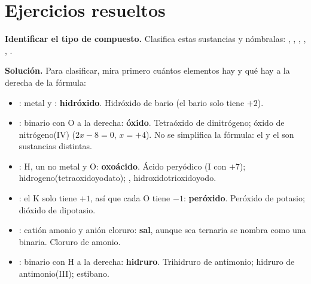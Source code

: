 
\sloppy %

\section{Ejercicios resueltos}\label{sec:ud5-resueltos}

\begin{example}
    \textbf{Identificar el tipo de compuesto.} Clasifica estas sustancias y nómbralas: , , ,
    , , .

    \textbf{Solución.} Para clasificar, mira primero cuántos elementos hay y qué hay a la derecha de la fórmula:
    \begin{itemize}
        \item {}: metal y : \textbf{hidróxido}. Hidróxido de bario (el bario solo tiene \(+2\)).
        \item {}: binario con O a la derecha: \textbf{óxido}. Tetraóxido de dinitrógeno; óxido de nitrógeno(IV)
        (\(2x - 8 = 0\), \(x = +4\)). No se simplifica la fórmula: el  y el  son sustancias distintas.
        \item {}: H, un no metal y O: \textbf{oxoácido}. Ácido peryódico (I con \(+7\)); hidrogeno(tetraoxidoyodato);
        , hidroxidotrioxidoyodo.
        \item {}: el K solo tiene \(+1\), así que cada O tiene \(-1\): \textbf{peróxido}. Peróxido de potasio; dióxido de
        dipotasio.
        \item {}: catión amonio y anión cloruro: \textbf{sal}, aunque sea ternaria se nombra como una binaria. Cloruro de
        amonio.
        \item {}: binario con H a la derecha: \textbf{hidruro}. Trihidruro de antimonio; hidruro de antimonio(III);
        estibano.
    \end{itemize}
\end{example}

